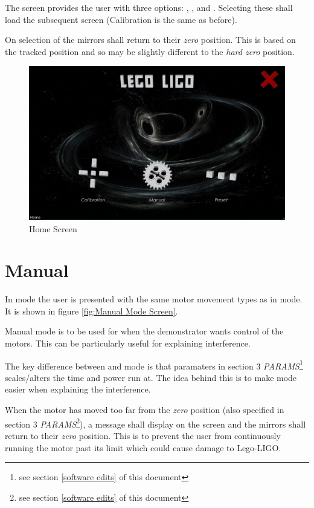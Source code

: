 \documentclass[a4paper, 12pt]{book}
\begin{document}
The  screen provides the user with three options: , , and . Selecting these shall load the subsequent screen (Calibration is the same as before).

On selection of  the mirrors shall return to their \textit{zero} position. This is based on the tracked position and so may be slightly different to the \textit{hard zero} position.
\begin{figure}[ht]
\centering
\includegraphics[width=120mm]{Home_Screen.png}
\caption{Home Screen}
\label{fig:Home Screen}
\end{figure}


\section{Manual}
In  mode the user is presented with the same motor movement types as in  mode. It is shown in figure \ref{fig:Manual Mode Screen}.

Manual mode is to be used for when the demonstrator wants control of the motors. This can be particularly useful for explaining interference.

The key difference between  and  mode is that paramaters in section 3 \textit{PARAMS}\footnote{\label{manual/calibration scaling} see section \ref{software edits} of this document} scales/alters the time and power run at. The idea behind this is to make  mode easier when explaining the interference.

When the motor has moved too far from the \textit{zero} position (also specified in section 3 \textit{PARAMS}\footnote{\label{manual limit} see section \ref{software edits} of this document}), a message shall display on the screen and the mirrors shall return to their \textit{zero} position. This is to prevent the user from continuously running the motor past its limit which could cause damage to Lego-LIGO.
\end{document}
